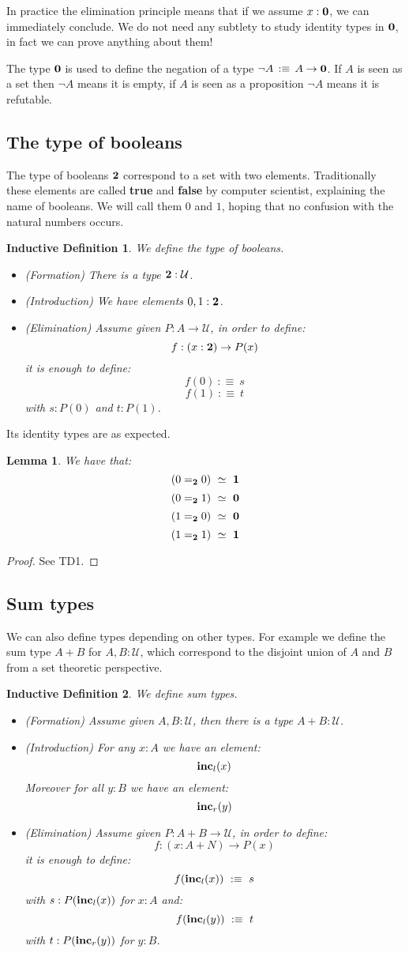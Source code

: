 \documentclass{article}
\newcommand{\sse}[1]{\medbreak \subsection{#1}}
\newcommand{\U}{{\mathcal U}}
\renewcommand{\r}{\rightarrow}
\newcommand{\one}{{\bf 1}}
\newcommand{\zero}{{\bf 0}}
\newcommand{\two}{{\bf 2}}
\newcommand{\inc}{\mathrm{\bf inc}}
\newtheorem{lemma}{Lemma}
\newtheorem{ind_def}{Inductive Definition}
\begin{document}
In practice the elimination principle means that if we assume $x:\zero$, we can immediately conclude. We do not need any subtlety to study identity types in $\zero$, in fact we can prove anything about them! 

The type $\zero$ is used to define the negation of a type $\lnot A \,:\equiv\, A\r \zero$. If $A$ is seen as a set then $\lnot A$ means it is empty, if $A$ is seen as a proposition $\lnot A$ means it is refutable.


\sse{The type of booleans}

The type of booleans $\two$ correspond to a set with two elements. Traditionally these elements are called {\bf true} and {\bf false} by computer scientist, explaining the name of booleans. We will call them $0$ and $1$, hoping that no confusion with the natural numbers occurs.

\begin{ind_def}
We define the type of booleans.
\begin{itemize}
\item (Formation) There is a type $\two:\U$.
\item (Introduction) We have elements $0,1:\two$.
\item (Elimination) Assume given $P:A\r \U$, in order to define:
\[f:(x:\two)\r P(x)\]
it is enough to define:
\[f(0) \ :\equiv\ s\]
\[f(1) \ :\equiv\ t\]
with $s:P(0)$ and $t:P(1)$.
\end{itemize}
\end{ind_def}

Its identity types are as expected.

\begin{lemma}
We have that:
\[(0=_\two0) \ \simeq \ \one\]
\[(0=_\two1) \ \simeq \ \zero\]
\[(1=_\two0) \ \simeq \ \zero\]
\[(1=_\two1) \ \simeq \ \one\]
\end{lemma}
\begin{proof}
See TD1.
\end{proof}


\sse{Sum types}

We can also define types depending on other types. For example we define the sum type $A+B$ for $A,B:\U$, which correspond to the disjoint union of $A$ and $B$ from a set theoretic perspective.

\begin{ind_def}
We define sum types.
\begin{itemize}
\item (Formation) Assume given $A,B:\U$, then there is a type $A+B:\U$.
\item (Introduction) For any $x:A$ we have an element:
\[\inc_l(x)\]
Moreover for all $y:B$ we have an element:
\[\inc_r(y)\]
\item (Elimination) Assume given $P:A+B\r \U$, in order to define:
\[f:(x:A+N)\r P(x)\]
it is enough to define:
\[f(\inc_l(x)) \ :\equiv\ s\]
with $s:P(\inc_l(x))$ for $x:A$ and:
\[f(\inc_l(y)) \ :\equiv\ t\]
with $t:P(\inc_r(y))$ for $y:B$.
\end{itemize}
\end{ind_def}
\end{document}
